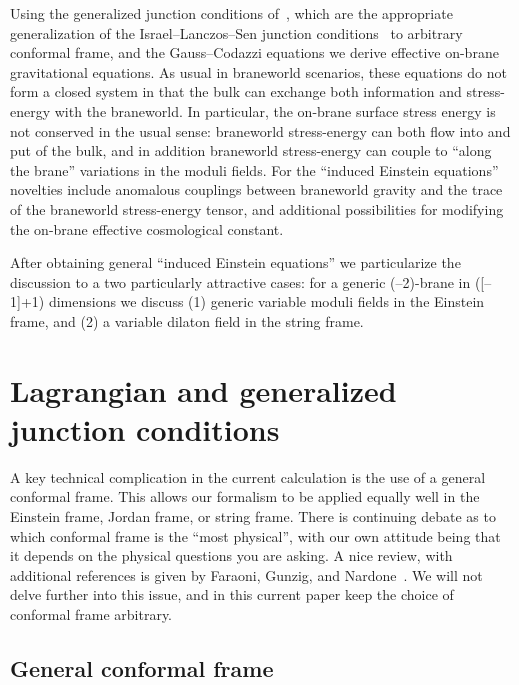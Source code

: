 \documentclass[a4paper,10pt]{article}
\begin{document}
Using the generalized junction conditions
of~\cite{generalized-junction}, which are the appropriate
generalization of the Israel--Lanczos--Sen junction
conditions~\cite{Israel-Lanczos-Sen} to arbitrary conformal frame, and
the Gauss--Codazzi equations we derive effective on-brane
gravitational equations.  As usual in braneworld scenarios, these
equations do not form a closed system in that the bulk can exchange
both information and stress-energy with the braneworld.  In
particular, the on-brane surface stress energy is not conserved in the
usual sense: braneworld stress-energy can both flow into and put of
the bulk, and in addition braneworld stress-energy can couple to
``along the brane'' variations in the moduli fields.  For the
``induced Einstein equations'' novelties include anomalous couplings
between braneworld gravity and the trace of the braneworld
stress-energy tensor, and additional possibilities for modifying the
on-brane effective cosmological constant.

After obtaining general ``induced Einstein equations'' we
particularize the discussion to a two particularly attractive cases:
for a generic (\coordHE{}--2)-brane in ([\coordHE{}--1]+1) dimensions we discuss (1)
generic variable moduli fields in the Einstein frame, and (2) a
variable dilaton field in the string frame.

\section{Lagrangian and generalized junction conditions}
\setcounter{equation}{0}

A key technical complication in the current calculation is the use of
a general conformal frame. This allows our formalism to be applied
equally well in the Einstein frame, Jordan frame, or string
frame. There is continuing debate as to which conformal frame is the
``most physical'', with our own attitude being that it depends on the
physical questions you are asking. A nice review, with additional
references is given by Faraoni, Gunzig, and
Nardone~\cite{conformal-frames}. We will not delve further into this
issue, and in this current paper keep the choice of conformal frame
arbitrary.


\subsection{General conformal frame}
\end{document}
